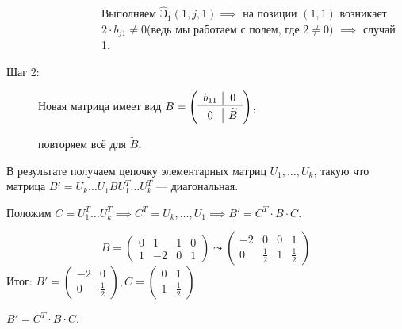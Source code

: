 \begin{description}
\begin{description}
\begin{description}
            Выполняем $\widehat{\text{Э}}_{1} (1, j, 1) \implies$ на позиции $(1,1)$ возникает $2 \cdot b_{j 1} \neq 0$(ведь мы работаем с полем, где $2 \neq 0$) $ \implies$ случай 1.
        \end{description}  
    \end{description}
    \item[Шаг 2:]
    Новая матрица имеет вид 
    $B = \left(
            \begin{array}{c|c}
                b_{1 1} & 0 \\
                \hline
                \noalign{\vskip 0.5ex}
                0 & \widetilde{B}
            \end{array} 
        \right)$,

    повторяем всё для $\widetilde{B}$.
\end{description}


В результате получаем цепочку элементарных матриц $U_{1}, \dots , U_{k}$, такую что матрица $B' = U_{k} \dots U_{1} B U^{T}_{1} \dots U^{T}_{k}$ --- диагональная.

Положим $C = U^{T}_{1} \dots U^{T}_{k} \implies C^{T} = U_{k}, \dots , U_{1} \implies B' = C^{T} \cdot B \cdot C $.

\begin{comment}
    Матрицу C можно вычислить модифицировав алгоритм. Припишем единичную матрицу E справа от B и будем выполнять с ней только элементарные преобразования строк.

    $(B \mid E) \leadsto (B' \mid P), P = U_{k} \dots U_{2} U_{1} = C^{T} \implies C = P^{T}$
\end{comment}

\begin{example}
    \begin{equation*}
         B = \left(
            \begin{array}{cc|cc} 
                0 & 1 & 1 & 0 \\ 
                1 & -2 & 0 & 1
            \end{array} 
        \right) \leadsto
        \left(
            \begin{array}{cc|cc}
                -2 & 0 & 0 & 1 \\
                0 & \frac{1}{2} & 1 & \frac{1}{2}
            \end{array}
        \right)
    \end{equation*}
    Итог: $B' = \begin{pmatrix} -2 & 0 \\ 0 & \frac{1}{2} \end{pmatrix}, C = \begin{pmatrix} 0 & 1 \\ 1 & \frac{1}{2} \end{pmatrix}$

    $B' = C^{T} \cdot B \cdot C$.
\end{example}

